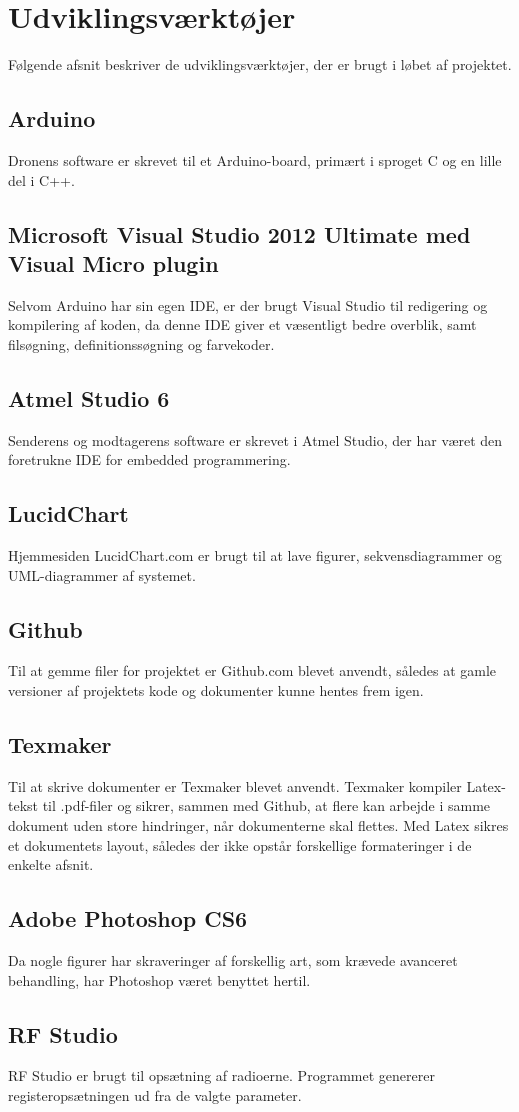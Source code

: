 \documentclass[Main]{subfiles}
\begin{document}
\section{Udviklingsværktøjer}
Følgende afsnit beskriver de udviklingsværktøjer, der er brugt i løbet af projektet.

\subsection{Arduino}
Dronens software er skrevet til et Arduino-board, primært i sproget C og en lille del i C++.

\subsection{Microsoft Visual Studio 2012 Ultimate med Visual Micro plugin}
Selvom Arduino har sin egen IDE, er der brugt Visual Studio til redigering og kompilering af koden, da denne IDE giver et væsentligt bedre overblik, samt filsøgning, definitionssøgning og farvekoder.

\subsection{Atmel Studio 6}
Senderens og modtagerens software er skrevet i Atmel Studio, der har været den foretrukne IDE for embedded programmering.

\subsection{LucidChart}
Hjemmesiden LucidChart.com er brugt til at lave figurer, sekvensdiagrammer og UML-diagrammer af systemet.

\subsection{Github}
Til at gemme filer for projektet er Github.com blevet anvendt, således at gamle versioner af projektets kode og dokumenter kunne hentes frem igen.

\subsection{Texmaker}
Til at skrive dokumenter er Texmaker blevet anvendt.
Texmaker kompiler Latex-tekst til .pdf-filer og sikrer, sammen med Github, at flere kan arbejde i samme dokument uden store hindringer, når dokumenterne skal flettes.
Med Latex sikres et dokumentets layout, således der ikke opstår forskellige formateringer i de enkelte afsnit.

\subsection{Adobe Photoshop CS6}
Da nogle figurer har skraveringer af forskellig art, som krævede avanceret behandling, har Photoshop været benyttet hertil.

\subsection{RF Studio}
RF Studio er brugt til opsætning af radioerne. Programmet genererer registeropsætningen ud fra de valgte parameter.
\end{document}
